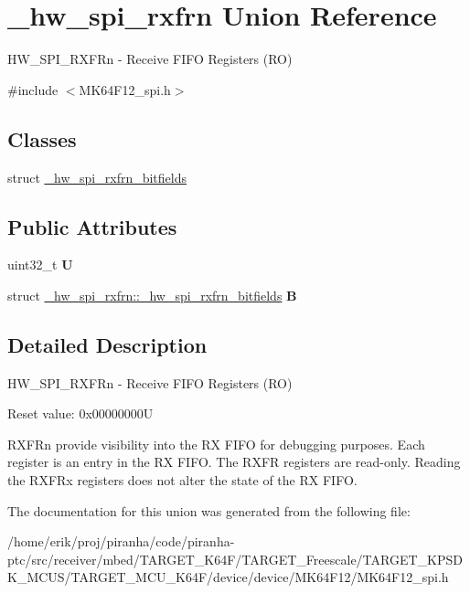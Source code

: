 \hypertarget{union__hw__spi__rxfrn}{}\section{\+\_\+hw\+\_\+spi\+\_\+rxfrn Union Reference}
\label{union__hw__spi__rxfrn}


H\+W\+\_\+\+S\+P\+I\+\_\+\+R\+X\+F\+Rn -\/ Receive F\+I\+FO Registers (RO)  




{\ttfamily \#include $<$M\+K64\+F12\+\_\+spi.\+h$>$}

\subsection*{Classes}
\begin{DoxyCompactItemize}
\item 
struct \hyperlink{struct__hw__spi__rxfrn_1_1__hw__spi__rxfrn__bitfields}{\+\_\+hw\+\_\+spi\+\_\+rxfrn\+\_\+bitfields}
\end{DoxyCompactItemize}
\subsection*{Public Attributes}
\begin{DoxyCompactItemize}
\item 
uint32\+\_\+t {\bfseries U}\hypertarget{union__hw__spi__rxfrn_a17cd9f19b7abbd5893a3ce53633c6b1b}{}\label{union__hw__spi__rxfrn_a17cd9f19b7abbd5893a3ce53633c6b1b}

\item 
struct \hyperlink{struct__hw__spi__rxfrn_1_1__hw__spi__rxfrn__bitfields}{\+\_\+hw\+\_\+spi\+\_\+rxfrn\+::\+\_\+hw\+\_\+spi\+\_\+rxfrn\+\_\+bitfields} {\bfseries B}\hypertarget{union__hw__spi__rxfrn_a5afa7adf64c7072acbf52544fc833505}{}\label{union__hw__spi__rxfrn_a5afa7adf64c7072acbf52544fc833505}

\end{DoxyCompactItemize}


\subsection{Detailed Description}
H\+W\+\_\+\+S\+P\+I\+\_\+\+R\+X\+F\+Rn -\/ Receive F\+I\+FO Registers (RO) 

Reset value\+: 0x00000000U

R\+X\+F\+Rn provide visibility into the RX F\+I\+FO for debugging purposes. Each register is an entry in the RX F\+I\+FO. The R\+X\+FR registers are read-\/only. Reading the R\+X\+F\+Rx registers does not alter the state of the RX F\+I\+FO. 

The documentation for this union was generated from the following file\+:\begin{DoxyCompactItemize}
\item 
/home/erik/proj/piranha/code/piranha-\/ptc/src/receiver/mbed/\+T\+A\+R\+G\+E\+T\+\_\+\+K64\+F/\+T\+A\+R\+G\+E\+T\+\_\+\+Freescale/\+T\+A\+R\+G\+E\+T\+\_\+\+K\+P\+S\+D\+K\+\_\+\+M\+C\+U\+S/\+T\+A\+R\+G\+E\+T\+\_\+\+M\+C\+U\+\_\+\+K64\+F/device/device/\+M\+K64\+F12/M\+K64\+F12\+\_\+spi.\+h\end{DoxyCompactItemize}
